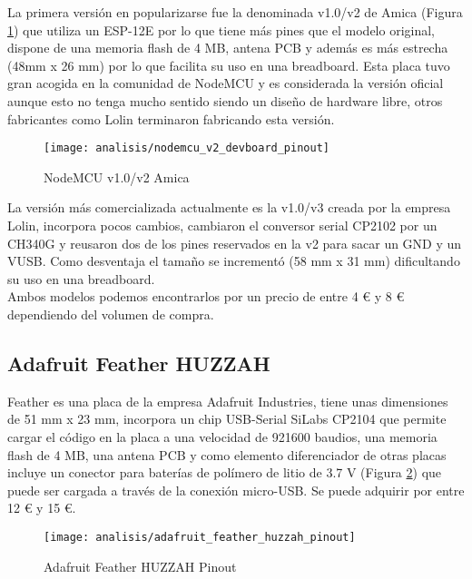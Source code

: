 \documentclass[../proyecto.tex]{subfiles}
\begin{document}
La primera versión en popularizarse fue la denominada v1.0/v2 de Amica (Figura \ref{fig:nodemcu_v2_devboard_pinout}) que utiliza un ESP-12E por lo que tiene más pines que el modelo original, dispone de una memoria flash de 4 MB, antena PCB y además es más estrecha (48mm x 26 mm) por lo que facilita su uso en una breadboard. Esta placa tuvo gran acogida en la comunidad de NodeMCU y es considerada la versión oficial aunque esto no tenga mucho sentido siendo un diseño de hardware libre, otros fabricantes como Lolin terminaron fabricando esta versión.\\

\begin{figure}[h]
\centering
\texttt{[image: analisis/nodemcu\_v2\_devboard\_pinout]}
\caption{NodeMCU v1.0/v2 Amica}
\label{fig:nodemcu_v2_devboard_pinout}
\end{figure}

La versión más comercializada actualmente es la v1.0/v3 creada por la empresa Lolin, incorpora pocos cambios, cambiaron el conversor serial CP2102 por un CH340G y reusaron dos de los pines reservados en la v2 para sacar un GND y un VUSB. Como desventaja el tamaño se incrementó (58 mm x  31 mm) dificultando su uso en una breadboard.\\

Ambos modelos podemos encontrarlos por un precio de entre 4 € y 8 € dependiendo del volumen de compra.\\

\subsection{Adafruit Feather HUZZAH}

Feather \cite{adafruit_feather_huzzah} es una placa de la empresa Adafruit Industries, tiene unas dimensiones de 51 mm x 23 mm, incorpora un chip USB-Serial SiLabs CP2104 que permite cargar el código en la placa a una velocidad de 921600 baudios, una memoria flash de 4 MB, una antena PCB y como elemento diferenciador de otras placas incluye un conector para baterías de polímero de litio de 3.7 V (Figura \ref{fig:adafruit_feather_huzzah_pinout}) que puede ser cargada a través de la conexión micro-USB. Se puede adquirir por entre 12 € y 15 €.

\begin{figure}[H]
\centering
\texttt{[image: analisis/adafruit\_feather\_huzzah\_pinout]}
\caption{Adafruit Feather HUZZAH Pinout}
\label{fig:adafruit_feather_huzzah_pinout}
\end{figure}
\end{document}
